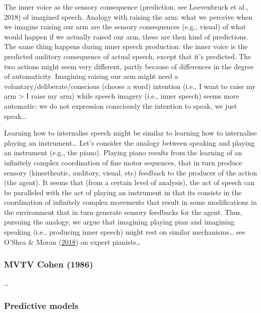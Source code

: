 \documentclass[a4paper,12pt,twoside,openright,oldfontcommands]{memoir}
\begin{document}
The inner voice as the sensory consequence (prediction, see Loevenbruck
et al., 2018) of imagined speech. Analogy with raising the arm: what we
perceive when we imagine raising our arm are the sensory consequences
(e.g., visual) of what would happen if we actually raised our arm, these
are then kind of predictions. The same thing happens during inner speech
production: the inner voice is the predicted auditory consequence of
actual speech, except that it's predicted. The two actions might seem
very different, partly because of differences in the degree of
automaticity. Imagining raising our arm might need a
voluntary/deliberate/conscious (choose a word) intention (i.e., I want
to raise my arm \textgreater{} I raise my arm) while speech imagery
(i.e., inner speech) seems more automatic: we do not expression
consciously the intention to speak, we just speak\ldots{}

Learning how to internalise speech might be similar to learning how to
internalise playing an instrument\ldots{} Let's consider the analogy
between speaking and playing an instrument (e.g., the piano). Playing
piano results from the learning of an infinitely complex coordination of
fine motor sequences, that in turn produce sensory (kinestheatic,
auditory, visual, etc) feedback to the producer of the action (the
agent). It seems that (from a certain level of analysis), the act of
speech can be paralleled with the act of playing an instrument in that
its consists in the coordination of infinitely complex movements that
result in some modifications in the environment that in turn generate
sensory feedbacks for the agent. Thus, pursuing the analogy, we argue
that imagining playing pian and imagining speaking (i.e., producing
inner speech) might rest on similar mechanisms\ldots{} see O'Shea \&
Moran (\protect\hyperlink{ref-oshea_go_2018}{2018}) on expert
pianists\ldots{}

\subsubsection{MVTV Cohen (1986)}\label{mvtv-cohen-1986}

\ldots{}

\subsubsection{Predictive models}\label{predictive-models}
\end{document}
